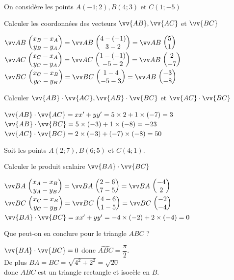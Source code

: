 \documentclass[12pt,a4paper]{article}  %
\begin{document}
\vspace{-0.3cm}
On considère les points $A(-1 ; 2), B(4 ; 3)$ et $C(1 ;-5)$
\begin{enumMet}
    \item Calculer les coordonnées des vecteurs $\vv{A B}, \vv{A C}$ et $\vv{B C}$\quad {}\\
    \begin{corrBox}
        $\Coord{AB}{x_B-x_A}{y_B-y_A}=\Coord{AB}{4-(-1)}{3-2}=\Coord{AB}{5}{1}$\\
        $\Coord{AC}{x_C-x_A}{y_C-y_A}=\Coord{AC}{1-(-1)}{-5-2}=\Coord{AB}{2}{-7}$\\
        $\Coord{BC}{x_C-x_B}{y_C-y_B}=\Coord{BC}{1-4}{-5-3}=\Coord{AB}{-3}{-8}$\\
    \end{corrBox}
    \item Calculer $\vv{A B} \cdot \vv{A C}, \vv{A B} \cdot \vv{B C}$ et $\vv{A C} \cdot \vv{B C}$\quad {}\\
    \begin{corrBox}
        $\vv{A B} \cdot \vv{A C}=x x^{\prime}+y y^{\prime}=5 \times 2+1 \times(-7)=3$\\
        $\vv{A B} \cdot \vv{B C}=5 \times(-3)+1 \times(-8)=-23$\\
        $\vv{A C} \cdot \vv{B C}=2 \times(-3)+(-7) \times(-8)=50$
    \end{corrBox}
\end{enumMet}

\newpage

\vspace{-0.3cm}
Soit les points $A(2 ; 7), B(6 ; 5)$ et $C(4 ; 1)$.
\begin{enumMet}
    \item Calculer le produit scalaire $\vv{B A} \cdot \vv{B C}$\quad {}\\
    \begin{corrBox}
        $\Coord{BA}{x_A-x_B}{y_A-y_B}=\Coord{BA}{2-6}{7-5}=\Coord{BA}{-4}{2}$\\
        $\Coord{BC}{x_C-x_B}{y_C-y_B}=\Coord{BC}{4-6}{1-5}=\Coord{BC}{-2}{-4}$\\
        $\vv{B A} \cdot \vv{B C}=x x^{\prime}+y y^{\prime}=-4 \times(-2)+2 \times(-4)=0$
    \end{corrBox}
    \item Que peut-on en conclure pour le triangle $A B C$ ?\quad {}\\
    \begin{corrBox}
        $\vv{B A} \cdot \vv{B C}=0$ donc $\widehat{A B C}=\dfrac{\pi}{2}$.\\
        De plus $B A=B C=\sqrt{4^{2}+2^{2}}=\sqrt{20}$\\
        donc $A B C$ est un triangle rectangle et isocèle en $B$.
    \end{corrBox}
\end{enumMet}
\end{document}
